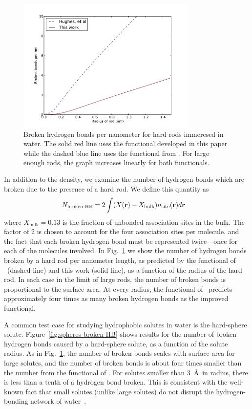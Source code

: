 \begin{figure}
\begin{center}
\includegraphics[width=3.5in]{figs/single-rod-broken-HB}
\end{center}
\caption{Broken hydrogen bonds per nanometer for hard rods
  immeresed in water.  The solid red line uses the functional developed
  in this paper while the dashed blue line uses the functional from
  \hughesetal. For large enough rods, the graph
  increases linearly for both functionals.}
\label{fig:single-rod-broken-HB}
\end{figure}

In addition to the density, we examine the number of hydrogen bonds
which are broken due to the presence of a hard rod.  We define this
quantity as
\begin{align}
  N_{\text{broken HB}} &= 2 \int (X(\textbf{r}) - X_{\text{bulk}})n_{\text{site}}(\textbf{r}) d\textbf{r}
\end{align}
where $X_{\text{bulk}} = 0.13$ is the fraction of unbonded
association sites in the bulk.  The factor of 2 is chosen to account
for the four association sites per molecule, and the fact that each
broken hydrogen bond must be represented twice---once for each of the
molecules involved.  In Fig.~\ref{fig:single-rod-broken-HB} we show
the number of hydrogen bonds broken by a hard rod per nanometer
length, as predicted by the functional of \hughesetal\ (dashed line)
and this work (solid line), as a function of the radius of the hard
rod.  In each case in the limit of large rods, the number of broken
bonds is proportional to the surface area.  At every radius, the
functional of \hughesetal\ predicts approximately four times as many
broken hydrogen bonds as the improved functional.

A common test case for studying hydrophobic solutes in water is the
hard-sphere solute.  Figure~\ref{fig:spheres-broken-HB} shows results
for the number of broken hydrogen bonds caused by a hard-sphere solute,
as a function of the solute radius.  As in
Fig.~\ref{fig:single-rod-broken-HB}, the number of broken bonds scales
with surface area for large solutes, and the number of broken bonds is
about four times smaller than the number from the functional of
\hughesetal.  For solutes smaller than
3~\AA\ in radius, there is less than a tenth of a hydrogen bond
broken. This is consistent with the well-known fact that small solutes
(unlike large solutes) do not disrupt the hydrogen-bonding network of
water~\cite{chandler2005}.

